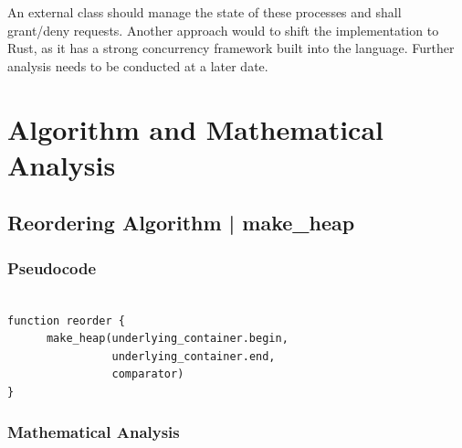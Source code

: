 \documentclass{article}
\begin{document}
\begin{flushleft}
An external class should manage the state of these processes and shall grant/deny requests.
Another approach would to shift the implementation to Rust, as it has a strong concurrency framework built into the language.
Further analysis needs to be conducted at a later date.
\end{flushleft}

\newpage

\section{Algorithm and Mathematical Analysis}

\subsection{Reordering Algorithm | make_heap}

\subsubsection{Pseudocode}

\begin{verbatim}

function reorder {
      make_heap(underlying_container.begin, 
                underlying_container.end,
                comparator)
}
\end{verbatim}

\subsubsection{Mathematical Analysis}
\end{document}
